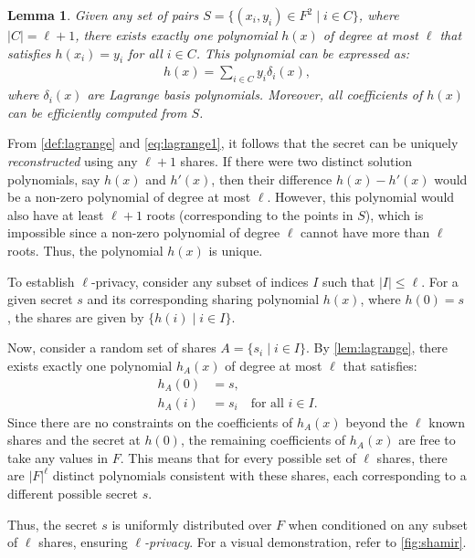 \documentclass[11pt]{report}
\theoremstyle{definition}
\theoremstyle{plain}
\newtheorem{lemma}{Lemma}[section]
\begin{document}
\begin{lemma}\label{lem:lagrange}
  Given any set of pairs $S = \{(x_i, y_i) \in F^2 \mid i \in C\}$, where $|C| = \ell + 1$, there exists exactly one polynomial $h(x)$ of degree at most $\ell$ that satisfies $h(x_i) = y_i$ for all $i \in C$. This polynomial can be expressed as:
  \begin{align*}
    h(x) = \sum_{i \in C} y_i \delta_i(x),
  \end{align*}
  where $\delta_i(x)$ are Lagrange basis polynomials. Moreover, all coefficients of $h(x)$ can be efficiently computed from $S$.
\end{lemma}

From \autoref{def:lagrange} and \autoref{eq:lagrange1}, it follows that the secret can be uniquely \textit{reconstructed} using any $\ell + 1$ shares. If there were two distinct solution polynomials, say $h(x)$ and $h'(x)$, then their difference $h(x) - h'(x)$ would be a non-zero polynomial of degree at most $\ell$. However, this polynomial would also have at least $\ell + 1$ roots (corresponding to the points in $S$), which is impossible since a non-zero polynomial of degree $\ell$ cannot have more than $\ell$ roots. Thus, the polynomial $h(x)$ is unique.

To establish $\ell$-privacy, consider any subset of indices $I$ such that $|I| \leq \ell$. For a given secret $s$ and its corresponding sharing polynomial $h(x)$, where $h(0) = s$, the shares are given by $\{h(i) \mid i \in I\}$.

Now, consider a random set of shares \( A = \{s_i \mid i \in I\} \). By \autoref{lem:lagrange}, there exists exactly one polynomial \( h_A(x) \) of degree at most $\ell$ that satisfies:
\begin{align*}
  h_A(0) & = s,                                 \\
  h_A(i) & = s_i \quad \text{for all } i \in I.
\end{align*}
Since there are no constraints on the coefficients of \( h_A(x) \) beyond the $\ell$ known shares and the secret at $h(0)$, the remaining coefficients of \( h_A(x) \) are free to take any values in $F$. This means that for every possible set of $\ell$ shares, there are $|F|^{\ell}$ distinct polynomials consistent with these shares, each corresponding to a different possible secret \( s \).

Thus, the secret \( s \) is uniformly distributed over \( F \) when conditioned on any subset of $\ell$ shares, ensuring \textit{$\ell$-privacy}. For a visual demonstration, refer to \autoref{fig:shamir}.
\end{document}
